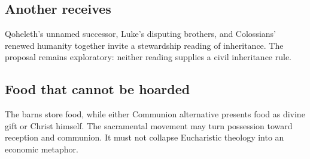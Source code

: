 \subsection*{Another receives}
Qoheleth's unnamed successor, Luke's disputing brothers, and Colossians'
renewed humanity together invite a stewardship reading of inheritance. The
proposal remains exploratory: neither reading supplies a civil inheritance
rule.
\subsection*{Food that cannot be hoarded}
The barns store food, while either Communion alternative presents food as
divine gift or Christ himself. The sacramental movement may turn possession
toward reception and communion. It must not collapse Eucharistic theology
into an economic metaphor.
